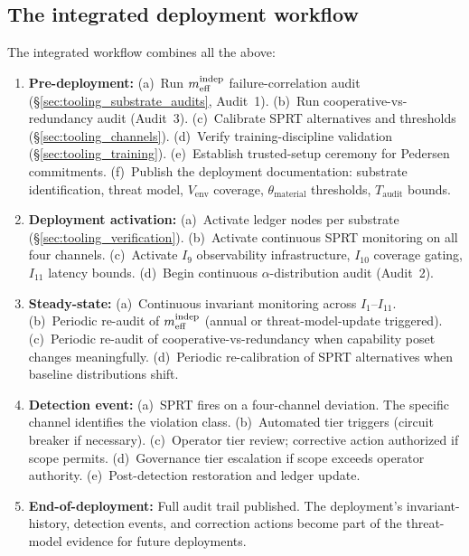 \subsection{The integrated deployment workflow}
\label{sec:tooling_workflow}

The integrated workflow combines all the above:

\begin{enumerate}
\item \textbf{Pre-deployment:}
  (a)~Run $m_{\mathrm{eff}}^{\mathrm{indep}}$ failure-correlation audit
  (\S\ref{sec:tooling_substrate_audits}, Audit~1).
  (b)~Run cooperative-vs-redundancy audit (Audit~3).
  (c)~Calibrate SPRT alternatives and thresholds
  (\S\ref{sec:tooling_channels}).
  (d)~Verify training-discipline validation
  (\S\ref{sec:tooling_training}).
  (e)~Establish trusted-setup ceremony for Pedersen commitments.
  (f)~Publish the deployment documentation: substrate identification,
  threat model, $V_{\mathrm{env}}$ coverage, $\theta_{\mathrm{material}}$
  thresholds, $T_{\mathrm{audit}}$ bounds.
\item \textbf{Deployment activation:}
  (a)~Activate ledger nodes per substrate
  (\S\ref{sec:tooling_verification}).
  (b)~Activate continuous SPRT monitoring on all four channels.
  (c)~Activate $I_9$ observability infrastructure, $I_{10}$
  coverage gating, $I_{11}$ latency bounds.
  (d)~Begin continuous $\alpha$-distribution audit (Audit~2).
\item \textbf{Steady-state:}
  (a)~Continuous invariant monitoring across $I_1$--$I_{11}$.
  (b)~Periodic re-audit of $m_{\mathrm{eff}}^{\mathrm{indep}}$ (annual or threat-model-update
  triggered).
  (c)~Periodic re-audit of cooperative-vs-redundancy when
  capability poset changes meaningfully.
  (d)~Periodic re-calibration of SPRT alternatives when baseline
  distributions shift.
\item \textbf{Detection event:}
  (a)~SPRT fires on a four-channel deviation. The specific channel
  identifies the violation class.
  (b)~Automated tier triggers (circuit breaker if necessary).
  (c)~Operator tier review; corrective action authorized if scope
  permits.
  (d)~Governance tier escalation if scope exceeds operator
  authority.
  (e)~Post-detection restoration and ledger update.
\item \textbf{End-of-deployment:}
  Full audit trail published. The deployment's invariant-history,
  detection events, and correction actions become part of the
  threat-model evidence for future deployments.
\end{enumerate}

